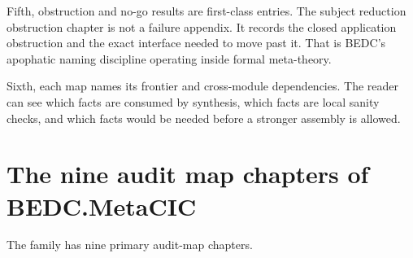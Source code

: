 Fifth, obstruction and no-go results are first-class entries. The subject
reduction obstruction chapter is not a failure appendix. It records the closed
application obstruction and the exact interface needed to move past it. That is
BEDC's apophatic naming discipline operating inside formal meta-theory.

Sixth, each map names its frontier and cross-module dependencies. The reader
can see which facts are consumed by synthesis, which facts are local sanity
checks, and which facts would be needed before a stronger assembly is allowed.

\section{The nine audit map chapters of BEDC.MetaCIC}
\label{sec:audit-map-family-nine-chapters}

The family has nine primary audit-map chapters.

